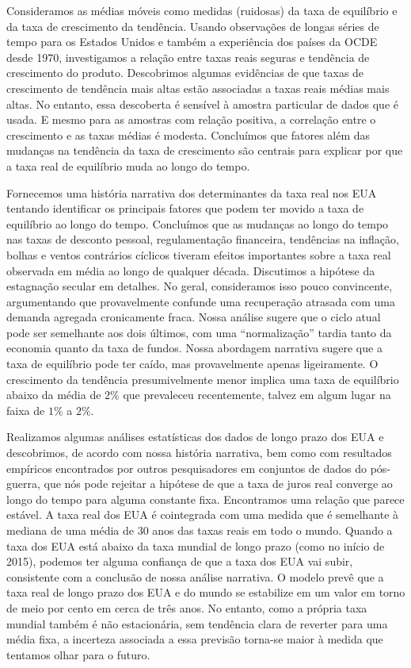 Consideramos as médias móveis como medidas (ruidosas) da taxa de equilíbrio e da taxa de crescimento da tendência. Usando observações de longas séries de tempo para os Estados Unidos e também a experiência dos países da OCDE desde 1970, investigamos a relação entre taxas reais seguras e tendência de crescimento do produto. Descobrimos algumas evidências de que taxas de crescimento de tendência mais altas estão associadas a taxas reais médias mais altas. No entanto, essa descoberta é sensível à amostra particular de dados que é usada. E mesmo para as amostras com relação positiva, a correlação entre o crescimento e as taxas médias é modesta. Concluímos que fatores além das mudanças na tendência da taxa de crescimento são centrais para explicar por que a taxa real de equilíbrio muda ao longo do tempo.

Fornecemos uma história narrativa dos determinantes da taxa real nos EUA tentando identificar os principais fatores que podem ter movido a taxa de equilíbrio ao longo do tempo. Concluímos que as mudanças ao longo do tempo nas taxas de desconto pessoal, regulamentação financeira, tendências na inflação, bolhas e ventos contrários cíclicos tiveram efeitos importantes sobre a taxa real observada em média ao longo de qualquer década. Discutimos a hipótese da estagnação secular em detalhes. No geral, consideramos isso pouco convincente, argumentando que provavelmente confunde uma recuperação atrasada com uma demanda agregada cronicamente fraca. Nossa análise sugere que o ciclo atual pode ser semelhante aos dois últimos, com uma “normalização” tardia tanto da economia quanto da taxa de fundos. Nossa abordagem narrativa sugere que a taxa de equilíbrio pode ter caído, mas provavelmente apenas ligeiramente. O crescimento da tendência presumivelmente menor implica uma taxa de equilíbrio abaixo da média de $2\%$ que prevaleceu recentemente, talvez em algum lugar na faixa de $1\%$ a $2\%$.

Realizamos algumas análises estatísticas dos dados de longo prazo dos EUA e descobrimos, de acordo com nossa história narrativa, bem como com resultados empíricos encontrados por outros pesquisadores em conjuntos de dados do pós-guerra, que nós pode rejeitar a hipótese de que a taxa de juros real converge ao longo do tempo para alguma constante fixa. Encontramos uma relação que parece estável. A taxa real dos EUA é cointegrada com uma medida que é semelhante à mediana de uma média de 30 anos das taxas reais em todo o mundo. Quando a taxa dos EUA está abaixo da taxa mundial de longo prazo (como no início de 2015), podemos ter alguma confiança de que a taxa dos EUA vai subir, consistente com a conclusão de nossa análise narrativa. O modelo prevê que a taxa real de longo prazo dos EUA e do mundo se estabilize em um valor em torno de meio por cento em cerca de três anos. No entanto, como a própria taxa mundial também é não estacionária, sem tendência clara de reverter para uma média fixa, a incerteza associada a essa previsão torna-se maior à medida que tentamos olhar para o futuro.
%
%

